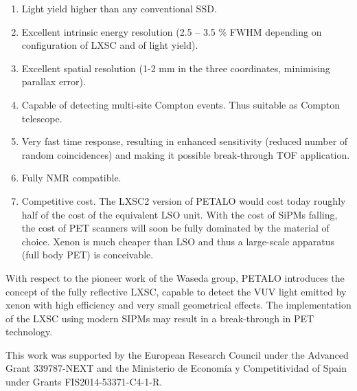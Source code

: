 \documentclass{JINST}
\begin{document}
\begin{enumerate}
\item Light yield higher than any conventional SSD.
\item Excellent intrinsic energy resolution (2.5 -- 3.5 \% FWHM depending on configuration of LXSC and of light yield). 
\item Excellent spatial resolution (1-2 mm in the three coordinates, minimising parallax error).
\item Capable of detecting multi-site Compton events. Thus suitable as Compton telescope.
\item Very fast time response, resulting in enhanced sensitivity (reduced number of random coincidences) and making it possible break-through TOF application. 
\item Fully NMR compatible. 
\item Competitive cost. The LXSC2 version of PETALO would cost today roughly half of the cost of the equivalent LSO unit. With the cost of SiPMs falling, the  cost of PET scanners will soon be fully dominated by the material of choice. Xenon is much cheaper than LSO and thus a large-scale apparatus (full body PET) is conceivable. 
\end{enumerate}

With respect to the pioneer work of the Waseda group, PETALO introduces the concept of the fully reflective LXSC, capable to detect the VUV light emitted by xenon with high efficiency and very small geometrical effects. The implementation of the LXSC using modern SIPMs may result in a break-through in PET technology. 


\acknowledgments

This work was supported by the European Research Council under the Advanced Grant 339787-NEXT and the Ministerio de Econom\'{i}a y Competitividad of Spain under Grants  FIS2014-53371-C4-1-R.


\end{document}
